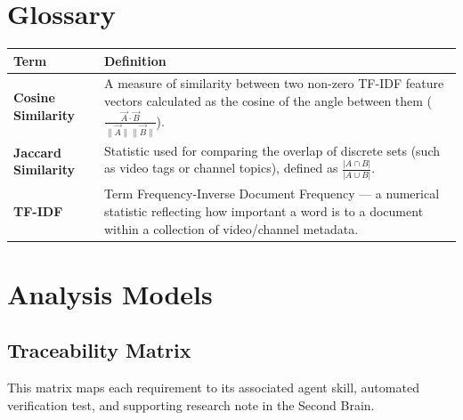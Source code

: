 \documentclass[11pt, a4paper]{article}
\begin{document}
\newpage
\appendix
\newpage
\appendix
\section{Glossary}

\begin{tabularx}{\textwidth}{>{\bfseries}p{3.8cm} X}
\toprule
\rowcolor{neutralgray}
Term & Definition \\
\midrule
Cosine Similarity & A measure of similarity between two non-zero TF-IDF feature vectors calculated as the cosine of the angle between them ($\frac{\vec{A} \cdot \vec{B}}{\|\vec{A}\|\|\vec{B}\|}$). \\
Jaccard Similarity & Statistic used for comparing the overlap of discrete sets (such as video tags or channel topics), defined as $\frac{|A \cap B|}{|A \cup B|}$. \\
TF-IDF & Term Frequency-Inverse Document Frequency — a numerical statistic reflecting how important a word is to a document within a collection of video/channel metadata. \\
\bottomrule
\end{tabularx}

\section{Analysis Models}


\subsection{Traceability Matrix}
This matrix maps each requirement to its associated agent skill, automated verification test, and supporting research note in the Second Brain.
\end{document}

